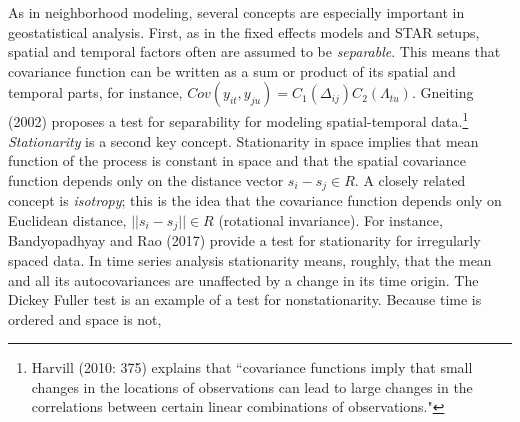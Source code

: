 \documentclass[12pt]{article}
\begin{document}
As in neighborhood modeling, several concepts are especially important in geostatistical
analysis. First, as in the fixed effects models and STAR setups, spatial and temporal
factors often are assumed to be \emph{separable}. This means that covariance function can be written as a
sum or product of its spatial and temporal parts,
for instance, $Cov(y_{it},y_{ju}) = C_1(\Delta_{ij})C_2(\Lambda_{tu})$. Gneiting (2002) proposes
a test for separability for modeling spatial-temporal data.\footnote{Harvill (2010: 375) explains
that ``covariance functions imply that small changes in the locations of
observations can lead to large changes in the correlations between certain linear combinations
of observations."}
\textit{Stationarity} is a second key concept. Stationarity in space implies that mean function of
the process is constant in space and that the spatial covariance function depends only on the
distance vector $s_i - s_j \in R $. A closely related concept is \emph{isotropy}; this is the
idea that the covariance function depends only on
Euclidean distance, $||s_i - s_j|| \in R$ (rotational invariance). For instance,
 Bandyopadhyay and Rao (2017) provide a test for
stationarity for irregularly spaced data.  In time series analysis stationarity means, roughly, that the mean and
all its autocovariances are unaffected by a change in its time origin. The Dickey Fuller
test is an example of a test for nonstationarity.  Because time is ordered and space is not,
\end{document}
